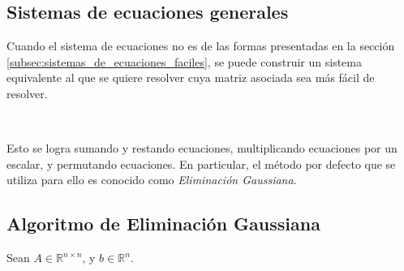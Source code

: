 
\subsection{Sistemas de ecuaciones generales}
\label{subsec:sistemas_de_ecuaciones_generales}

Cuando el sistema de ecuaciones no es de las formas presentadas en la sección \ref{subsec:sistemas_de_ecuaciones_faciles}, se puede construir un sistema equivalente al que se quiere resolver cuya matriz asociada sea más fácil de resolver.

\

Esto se logra sumando y restando ecuaciones, multiplicando ecuaciones por un escalar, y permutando ecuaciones. En particular, el método por defecto que se utiliza para ello es conocido como \emph{Eliminación Gaussiana}.

\subsection{Algoritmo de Eliminación Gaussiana}
\label{subsec:algotimo_de_eliminacion_gaussiana}

Sean $A \in \mathbb{R}^{n \times n}$, y $b \in \mathbb{R}^n$.

